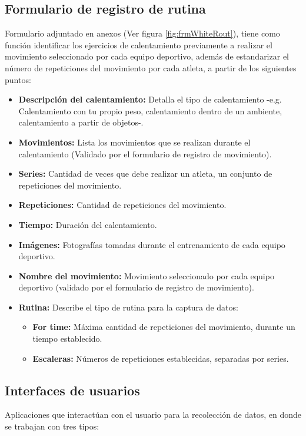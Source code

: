 \subsection{Formulario de registro de rutina} \label{ins:frmRout}
Formulario adjuntado en anexos (Ver figura \ref{fig:frmWhiteRout}), tiene como funci\'on identificar los ejercicios de calentamiento  previamente a realizar el movimiento seleccionado por cada equipo deportivo, adem\'as de estandarizar el n\'umero de repeticiones del movimiento por cada atleta, a partir de los siguientes puntos:
\begin{itemize}
	\item \textbf{Descripci\'on del calentamiento:} Detalla el tipo de calentamiento -e.g. Calentamiento con tu propio peso, calentamiento dentro de un ambiente, calentamiento a partir de objetos-.
	\item \textbf{Movimientos:} Lista los movimientos que se realizan durante el calentamiento (Validado por el formulario de registro de movimiento).
	\item \textbf{Series:} Cantidad de veces que debe realizar un atleta, un conjunto de repeticiones del movimiento.
	\item \textbf{Repeticiones:} Cantidad de repeticiones del movimiento.
	\item \textbf{Tiempo:} Duraci\'on del calentamiento.
	\item \textbf{Im\'agenes:} Fotograf\'ias tomadas durante el entrenamiento de cada equipo deportivo.
	\item \textbf{Nombre del movimiento:} Movimiento seleccionado por cada equipo deportivo  (validado por el formulario de registro de movimiento).
	\item \textbf{Rutina:} Describe el tipo de rutina para la captura de datos:
	\begin{itemize}
		\item \textbf{For time:} M\'axima cantidad de repeticiones del movimiento, durante un tiempo establecido.
		\item \textbf{Escaleras:} N\'umeros de repeticiones establecidas, separadas por series.
	\end{itemize}	
\end{itemize}
\subsection{Interfaces de usuarios} \label{ins:UI}
Aplicaciones que interact\'uan con el usuario para la recolecci\'on de datos, en donde se trabajan con  tres tipos:
